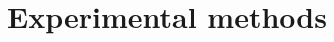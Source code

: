 \documentclass[letterpaper,12pt]{report}
\begin{document}

\tableofcontents

%
%
%
%
%

\chapter{Experimental methods}


%
%
%
%
%

\label{endtext} 
\printbibliography
\end{document}
